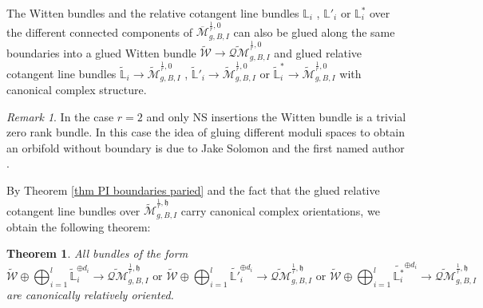 \documentclass[11pt]{amsart}
\newtheorem{thm}[dummy]{Theorem}
\theoremstyle{definition}
\theoremstyle{remark}
\newtheorem{rmk}[dummy]{Remark}
\newcommand{\<}{\left<}
\renewcommand{\>}{\right>}
\numberwithin{equation}{section}
\def\Mbar{{\overline{\mathcal M}}}
\def\h{{\mathfrak h}}
\begin{document}
    
    The Witten bundles and the relative cotangent line bundles $\mathbb L_i$%
, $\mathbb L'_i$ or %
$\mathbb L_i^*$ over the different connected components of $\Mbar^{\frac{1}{r},0}_{g,B,I}$  can also be glued along the same boundaries into a glued Witten bundle $\widetilde{\mathcal W}\to\widetilde{\mathcal {QM}}^{\frac{1}{r},0}_{g,B,I}$ and glued relative cotangent line bundles $\widetilde{\mathbb L}_i\to\widetilde{\mathcal M}^{\frac{1}{r},0}_{g,B,I}$%
, $\widetilde{\mathbb L}'_i\to\widetilde{\mathcal M}^{\frac{1}{r},0}_{g,B,I}$ or $\widetilde{\mathbb L}^*_i\to\widetilde{\mathcal M}^{\frac{1}{r},0}_{g,B,I}$ %
with canonical complex structure.
\begin{rmk}
In the case $r=2$ and only %
NS insertions the %
Witten bundle is a trivial zero rank bundle. In this case the idea of gluing different moduli spaces to obtain an orbifold without boundary is due to Jake Solomon and the %
first named author %
\cite{ST_unpublished}. 
\end{rmk}
     By Theorem \ref{thm  PI boundaries paried} and the fact that the glued relative cotangent line %
bundles over $\widetilde{\mathcal M}^{\frac{1}{r},\h}_{g,B,I}$ carry canonical complex orientations, we obtain the following theorem:
    \begin{thm}\cite[Theorem 4.13]{TZ1}
      All %
bundles of the %
form
    \[\widetilde{{\mathcal{W}}}\oplus\bigoplus_{i=1}^l\widetilde{\mathbb{L}}_i^{\oplus d_i}\to \widetilde{\mathcal {QM}}^{\frac{1}{r},\h}_{g,B,I} 
    \text{ or } 
    \widetilde{{\mathcal{W}}}\oplus\bigoplus_{i=1}^l {\widetilde{\mathbb {L}'}}_i^{\oplus d_i}\to \widetilde{\mathcal {QM}}^{\frac{1}{r},\h}_{g,B,I}\text{ or } 
    \widetilde{{\mathcal{W}}}\oplus\bigoplus_{i=1}^l {\widetilde{\mathbb {L}^*_i}}^{\oplus d_i}\to \widetilde{\mathcal {QM}}^{\frac{1}{r},\h}_{g,B,I}\]are %
canonically relatively oriented.   
    \end{thm}
\end{document}
